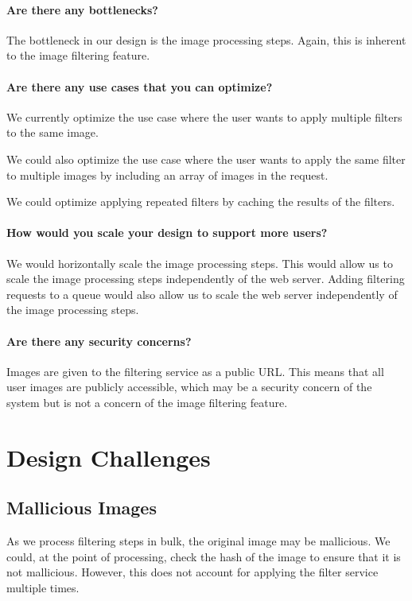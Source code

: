 \documentclass{csse4400}
\begin{document}
\paragraph{Are there any bottlenecks?}
The bottleneck in our design is the image processing steps.
Again, this is inherent to the image filtering feature.

\paragraph{Are there any use cases that you can optimize?}
We currently optimize the use case where the user wants to apply multiple filters to the same image.

We could also optimize the use case where the user wants to apply the same filter to multiple images by including an array of images in the request.

We could optimize applying repeated filters by caching the results of the filters.

\paragraph{How would you scale your design to support more users?}
We would horizontally scale the image processing steps.
This would allow us to scale the image processing steps independently of the web server.
Adding filtering requests to a queue would also allow us to scale the web server independently of the image processing steps.

\paragraph{Are there any security concerns?}
Images are given to the filtering service as a public URL.
This means that all user images are publicly accessible,
which may be a security concern of the system but is not a concern of the image filtering feature.

\section{Design Challenges}

\subsection{Mallicious Images}
As we process filtering steps in bulk,
the original image may be mallicious.
We could, at the point of processing,
check the hash of the image to ensure that it is not mallicious.
However, this does not account for applying the filter service multiple times.
\end{document}
